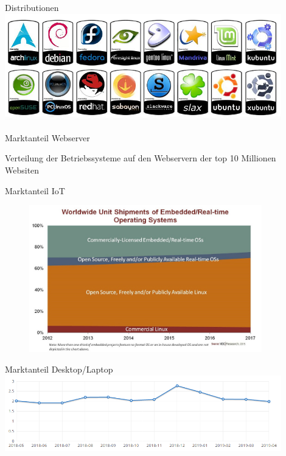 \documentclass[10pt]{beamer}
\begin{document}
\begin{frame}{Distributionen}
    \centering
    \includegraphics[keepaspectratio,width=0.9\textwidth]{img/logos_2.png}
\end{frame}

\begin{frame}{Marktanteil Webserver}
    \begin{centering}
	\begin{bchart}[step=10,max=100]
			\smallskip
	\end{bchart}
\end{centering}
    
    Verteilung der Betriebssysteme auf den Webservern der top 10 Millionen Websiten
\end{frame}

\begin{frame}{Marktanteil IoT}
\begin{figure}
	\includegraphics[keepaspectratio,
	width=0.9\textwidth]{img/iot.jpg}
\end{figure}
\end{frame}


\begin{frame}{Marktanteil Desktop/Laptop}
\includegraphics[keepaspectratio, width=0.9\textwidth]{img/market_share.png}
\end{frame}
\end{document}

